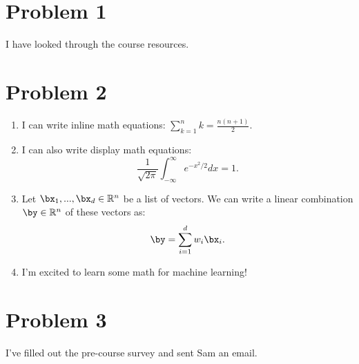 \documentclass[12pt]{article}
\begin{document}
\psetheader %

\section*{Problem 1}

I have looked through the course resources.
\newpage

\section*{Problem 2}
\begin{enumerate}[label=(\alph*)]
		\item I can write inline math equations: $\sum_{k=1}^n k = \frac{n(n+1)}{2}$.
		\item I can also write display math equations: \[\frac{1}{\sqrt{2\pi}}
				\int_{-\infty}^{\infty} e^{-x^2/2} dx = 1.\]
		\item Let $\bx_1, . . . , \bx_d \in \mathbb{R}^n$ be a list of vectors. We can write a
				linear combination $\by \in \mathbb{R}^n$ of these vectors as: \[\by= \sum_{i=1}^{d}w_i\bx_i.\]
		\item I’m excited to learn some math for machine learning!
\end{enumerate}

\newpage

\section*{Problem 3}
I’ve filled out the pre-course survey and sent Sam an email.
\end{document}
